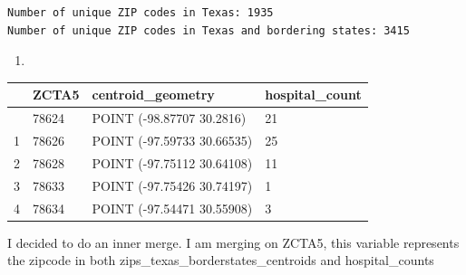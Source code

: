 \documentclass[
  letterpaper,
  DIV=11,
  numbers=noendperiod]{scrartcl}
\newenvironment{Shaded}{\begin{snugshade}}{\end{snugshade}}
\newcommand{\BuiltInTok}[1]{\textcolor[rgb]{0.00,0.23,0.31}{#1}}
\newcommand{\NormalTok}[1]{\textcolor[rgb]{0.00,0.23,0.31}{#1}}
\newcommand{\OperatorTok}[1]{\textcolor[rgb]{0.37,0.37,0.37}{#1}}
\newcommand{\StringTok}[1]{\textcolor[rgb]{0.13,0.47,0.30}{#1}}
\newcommand{\VariableTok}[1]{\textcolor[rgb]{0.07,0.07,0.07}{#1}}
\newcommand{\VerbatimStringTok}[1]{\textcolor[rgb]{0.13,0.47,0.30}{#1}}
\providecommand{\tightlist}{%
  \setlength{\itemsep}{0pt}\setlength{\parskip}{0pt}}\usepackage{longtable,booktabs,array}
\begin{document}
\begin{verbatim}
Number of unique ZIP codes in Texas: 1935
Number of unique ZIP codes in Texas and bordering states: 3415
\end{verbatim}

\begin{enumerate}
\def\labelenumi{\arabic{enumi}.}
\setcounter{enumi}{2}
\tightlist
\item
\end{enumerate}

\begin{Shaded}
\end{Shaded}

\begin{longtable}[]{@{}llll@{}}
\toprule\noalign{}
& ZCTA5 & centroid\_geometry & hospital\_count \\
\midrule\noalign{}
\endhead
\bottomrule\noalign{}
\endlastfoot
0 & 78624 & POINT (-98.87707 30.2816) & 21 \\
1 & 78626 & POINT (-97.59733 30.66535) & 25 \\
2 & 78628 & POINT (-97.75112 30.64108) & 11 \\
3 & 78633 & POINT (-97.75426 30.74197) & 1 \\
4 & 78634 & POINT (-97.54471 30.55908) & 3 \\
\end{longtable}

I decided to do an inner merge. I am merging on ZCTA5, this variable
represents the zipcode in both zips\_texas\_borderstates\_centroids and
hospital\_counts
\end{document}
